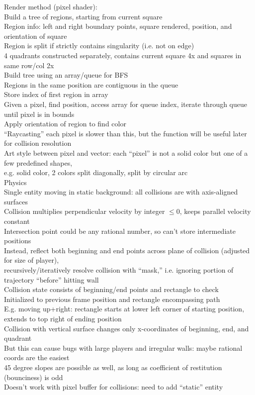 \documentclass{article}
\begin{document}
Render method (pixel shader): \\
Build a tree of regions, starting from current square \\
Region info: left and right boundary points, square rendered,
position, and orientation of square \\
Region is split if strictly contains singularity (i.e. not on edge) \\
4 quadrants constructed separately,
contains current square 4x and squares in same row/col 2x \\
Build tree using an array/queue for BFS \\
Regions in the same position are contiguous in the queue \\
Store index of first region in array \\
Given a pixel, find position, access array for queue index,
iterate through queue until pixel is in bounds \\
Apply orientation of region to find color \\
``Raycasting'' each pixel is slower than this,
but the function will be useful later for collision resolution \\

Art style between pixel and vector:
each ``pixel'' is not a solid color but one of a few predefined shapes, \\
e.g. solid color, 2 colors split diagonally, split by circular arc \\

Physics \\
Single entity moving in static background:
all collisions are with axis-aligned surfaces \\
Collision multiplies perpendicular velocity by integer $\leq 0$,
keeps parallel velocity constant \\
Intersection point could be any rational number,
so can't store intermediate positions \\
Instead, reflect both beginning and end points across plane of collision
(adjusted for size of player), \\
recursively/iteratively resolve collision with ``mask,''
i.e. ignoring portion of trajectory ``before'' hitting wall \\
Collision state consists of beginning/end points
and rectangle to check \\
Initialized to previous frame position
and rectangle encompassing path \\
E.g. moving up+right: rectangle starts at lower left corner of starting position,
extends to top right of ending position \\
Collision with vertical surface changes only x-coordinates of beginning, end, and quadrant \\
But this can cause bugs with large players and irregular walls:
maybe rational coords are the easiest \\
45 degree slopes are possible as well,
as long as coefficient of restitution (bounciness) is odd \\
Doesn't work with pixel buffer for collisions:
need to add ``static'' entity \\
\end{document}
